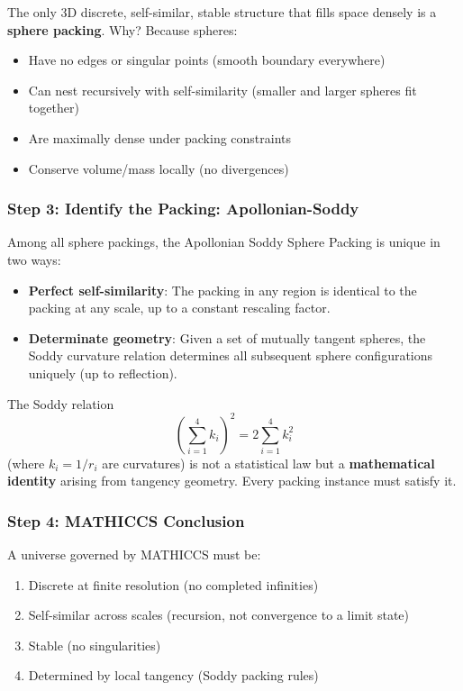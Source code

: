 \documentclass[11pt,a4paper]{article}
\begin{document}
The only 3D discrete, self-similar, stable structure that fills space densely is a \textbf{sphere packing}. Why? Because spheres:
\begin{itemize}
\item Have no edges or singular points (smooth boundary everywhere)
\item Can nest recursively with self-similarity (smaller and larger spheres fit together)
\item Are maximally dense under packing constraints
\item Conserve volume/mass locally (no divergences)
\end{itemize}

\subsubsection{Step 3: Identify the Packing: Apollonian-Soddy}

Among all sphere packings, the Apollonian Soddy Sphere Packing is unique in two ways:

\begin{itemize}
\item \textbf{Perfect self-similarity}: The packing in any region is identical to the packing at any scale, up to a constant rescaling factor.
\item \textbf{Determinate geometry}: Given a set of mutually tangent spheres, the Soddy curvature relation determines all subsequent sphere configurations uniquely (up to reflection).
\end{itemize}

The Soddy relation
\[
\left(\sum_{i=1}^4 k_i\right)^2 = 2\sum_{i=1}^4 k_i^2
\]
(where $k_i = 1/r_i$ are curvatures) is not a statistical law but a \textbf{mathematical identity} arising from tangency geometry. Every packing instance must satisfy it.

\subsubsection{Step 4: MATHICCS Conclusion}

A universe governed by MATHICCS must be:
\begin{enumerate}
\item Discrete at finite resolution (no completed infinities)
\item Self-similar across scales (recursion, not convergence to a limit state)
\item Stable (no singularities)
\item Determined by local tangency (Soddy packing rules)
\end{enumerate}
\end{document}
